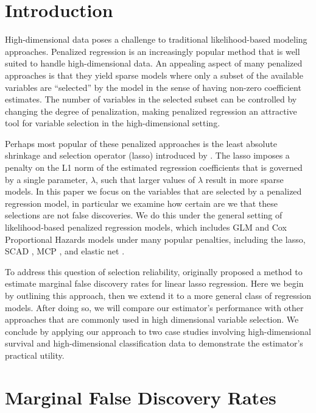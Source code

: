 \section{Introduction}

High-dimensional data poses a challenge to traditional likelihood-based modeling approaches.  Penalized regression is an increasingly popular method that is well suited to handle high-dimensional data.  An appealing aspect of many penalized approaches is that they yield sparse models where only a subset of the available variables are ``selected'' by the model in the sense of having non-zero coefficient estimates.  The number of variables in the selected subset can be controlled by changing the degree of penalization, making penalized regression an attractive tool for variable selection in the high-dimensional setting.

Perhaps most popular of these penalized approaches is the least absolute shrinkage and selection operator (lasso) introduced by \citet{tibshirani_1996}. The lasso imposes a penalty on the L1 norm of the estimated regression coefficients that is governed by a single parameter, $\lambda$, such that larger values of $\lambda$ result in more sparse models. In this paper we focus on the variables that are selected by a penalized regression model, in particular we examine how certain are we that these selections are not false discoveries. We do this under the general setting of likelihood-based penalized regression models, which includes GLM and Cox Proportional Hazards models under many popular penalties, including the lasso, SCAD \citep{SCAD}, MCP \citep{MCP}, and elastic net \citep{Elastic_Net}.

To address this question of selection reliability, \citet{Breheny2017} originally proposed a method to estimate marginal false discovery rates for linear lasso regression. Here we begin by outlining this approach, then we extend it to a more general class of regression models.  After doing so, we will compare our estimator's performance with other approaches that are commonly used in high dimensional variable selection.  We conclude by applying our approach to two case studies involving high-dimensional survival and high-dimensional classification data to demonstrate the estimator's practical utility.

\section{Marginal False Discovery Rates}

